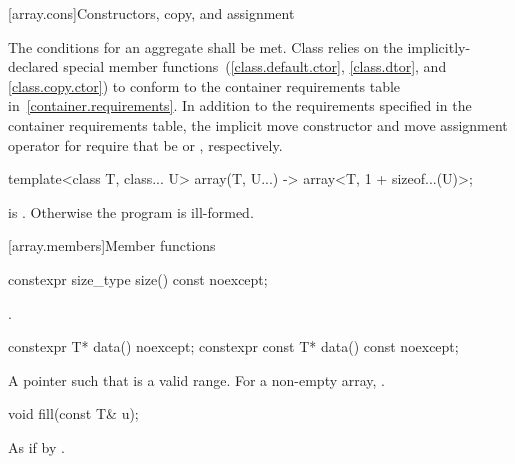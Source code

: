 [array.cons]{Constructors, copy, and assignment}

\pnum
{}%
%
The conditions for an aggregate shall be
met. Class  relies on the implicitly-declared special
member functions~(\ref{class.default.ctor}, \ref{class.dtor}, and \ref{class.copy.ctor}) to
conform to the container requirements table in~\ref{container.requirements}.
In addition to the requirements specified in the container requirements table,
the implicit move constructor and move assignment operator for 
require that  be  or ,
respectively.

\begin{itemdecl}
template<class T, class... U>
  array(T, U...) -> array<T, 1 + sizeof...(U)>;
\end{itemdecl}
\begin{itemdescr}
\pnum
\requires {} is . Otherwise the program is ill-formed.
\end{itemdescr}

[array.members]{Member functions}

%
\begin{itemdecl}
constexpr size_type size() const noexcept;
\end{itemdecl}

\begin{itemdescr}
\pnum\returns {}.
\end{itemdescr}

%
\begin{itemdecl}
constexpr T* data() noexcept;
constexpr const T* data() const noexcept;
\end{itemdecl}

\begin{itemdescr}
\pnum \returns
A pointer such that  is a valid range. For a
non-empty array,  \tcode{==} .
\end{itemdescr}

%
\begin{itemdecl}
void fill(const T& u);
\end{itemdecl}

\begin{itemdescr}
\pnum
\effects As if by .
\end{itemdescr}

